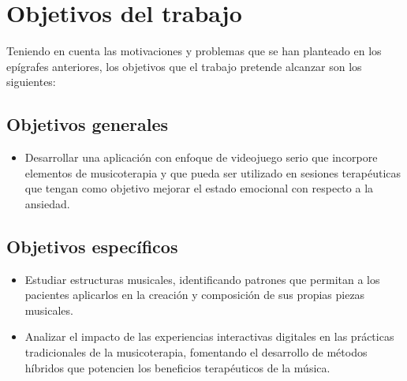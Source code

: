 \section{Objetivos del trabajo}

Teniendo en cuenta las motivaciones y problemas que se han planteado en los epígrafes anteriores, los objetivos que el trabajo pretende alcanzar son los siguientes:

\subsection{Objetivos generales}

\begin{itemize}
	\item Desarrollar una aplicación con enfoque de videojuego serio que incorpore elementos de musicoterapia y que pueda ser utilizado en sesiones terapéuticas que tengan como objetivo mejorar el estado emocional con respecto a la ansiedad.
\end{itemize}

\subsection{Objetivos específicos}

\begin{itemize}
	\item Estudiar estructuras musicales, identificando patrones que permitan a los pacientes aplicarlos en la creación y composición de sus propias piezas musicales.
	\item Analizar el impacto de las experiencias interactivas digitales en las prácticas tradicionales de la musicoterapia, fomentando el desarrollo de métodos híbridos que potencien los beneficios terapéuticos de la música.
\end{itemize}